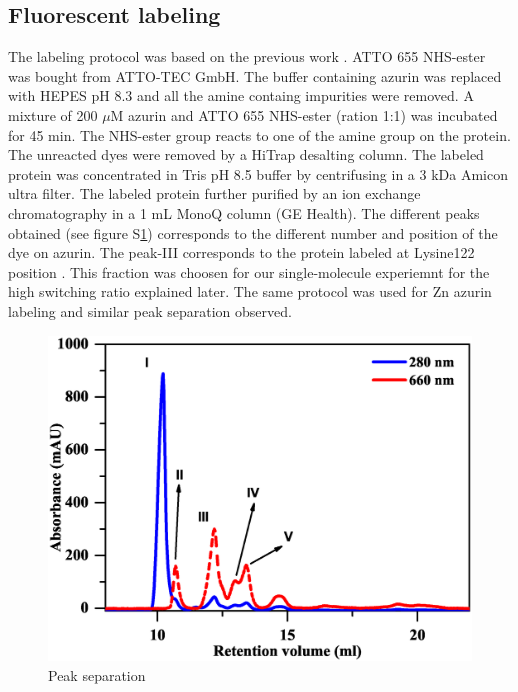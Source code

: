 \documentclass[11pt,a4paper,onecolumn]{article}
\begin{document}
\subsection{Fluorescent labeling}
The labeling protocol was based on the previous work \cite{nicolardi2012topdown}. ATTO 655 NHS-ester was bought from ATTO-TEC GmbH. The buffer containing azurin was replaced with HEPES pH 8.3 and all the amine containg impurities were removed. A mixture of 200 $\mu$M azurin and ATTO 655 NHS-ester (ration 1:1) was incubated for 45 min. The NHS-ester group reacts to one of the amine group on the protein. The unreacted dyes were removed by a HiTrap desalting column. The labeled protein was concentrated in Tris pH 8.5 buffer by centrifusing in a 3 kDa Amicon ultra filter. The labeled protein further purified by an ion exchange chromatography in a 1 mL MonoQ column (GE Health). The different peaks obtained (see figure S\ref{SIfig: peak_sep}) corresponds to the different number and position of the dye on azurin. The peak-III corresponds to the protein labeled at Lysine122 position \cite{nicolardi2012topdown}. This fraction was choosen for our single-molecule experiemnt for the high switching ratio explained later. The same protocol was used for Zn azurin labeling and similar peak separation observed.
\begin{figure}
  \centering
  \includegraphics{Figure_SI/peak_separation.eps}
  \makeatletter
  \renewcommand{\fnum@figure}{\figurename~S\thefigure}
  \makeatother
  \caption{Peak separation}
  \label{SIfig: peak_sep}
\end{figure}
\end{document}
